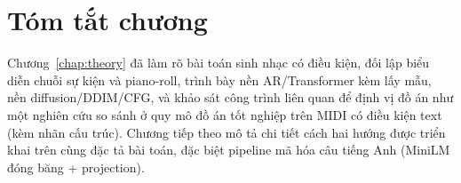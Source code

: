 \section*{Tóm tắt chương}

Chương~\ref{chap:theory} đã làm rõ bài toán sinh nhạc có điều kiện, đối lập biểu diễn chuỗi sự kiện và piano-roll, trình bày nền AR/Transformer kèm lấy mẫu, nền diffusion/DDIM/CFG, và khảo sát công trình liên quan để định vị đồ án như một nghiên cứu so sánh ở quy mô đồ án tốt nghiệp trên MIDI có điều kiện text (kèm nhãn cấu trúc). Chương tiếp theo mô tả chi tiết cách hai hướng được triển khai trên cùng đặc tả bài toán, đặc biệt pipeline mã hóa câu tiếng Anh (MiniLM đóng băng + projection).
